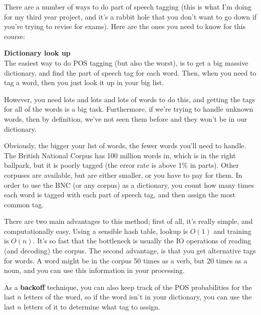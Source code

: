 There are a number of ways to do part of speech tagging (this is what I'm doing
for my third year project, and it's a rabbit hole that you don't want to go down
if you're trying to revise for exams). Here are the ones you need to know for
this course:


\begin{description}
  \item \textbf{Dictionary look up}\\
  The easiest way to do POS tagging (but also the worst), is to get a big
  massive dictionary, and find the part of speech tag for each word. Then, when
  you need to tag a word, then you just look it up in your big list.

  However, you need lots and lots and lots of words to do this, and getting the
  tags for all of the words is a big task. Furthermore, if we're trying to
  handle unknown words, then by definition, we've not seen them before and they
  won't be in our dictionary.

  Obviously, the bigger your list of words, the fewer words you'll need to
  handle. The British National Corpus has 100 million words in, which is in the
  right ballpark, but it is poorly tagged (the error rate is above 1\% in
  parts). Other corpuses are available, but are either smaller, or you have to
  pay for them. In order to use the BNC (or any corpus) as a dictionary, you
  count how many times each word is tagged with each part of speech tag, and
  then assign the most common tag.

  There are two main advantages to this method; first of all, it's really
  simple, and computationally easy. Using a sensible hash table, lookup is
  $O(1)$ and training is $O(n)$. It's so fast that the bottleneck is usually the
  IO operations of reading (and decoding) the corpus. The second advantage, is
  that you get alternative tags for words. A word might be in the corpus 50
  times as a verb, but 20 times as a noun, and you can use this information in
  your processing.

  As a \textbf{backoff} technique, you can also keep track of the POS
  probabilities for the last $n$ letters of the word, so if the word isn't in
  your dictionary, you can use the last $n$ letters of it to determine what tag
  to assign.


\end{description}
